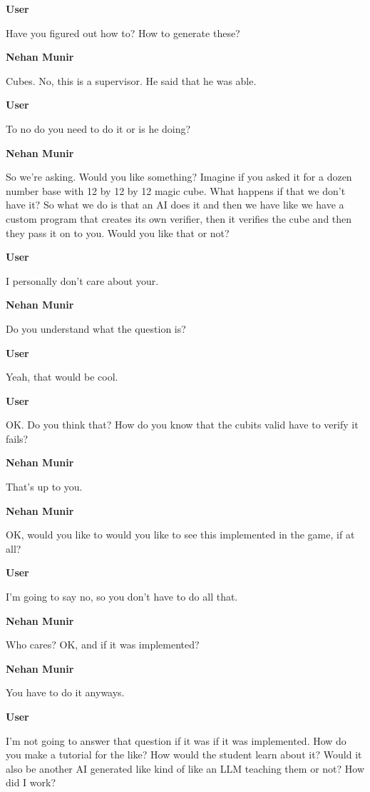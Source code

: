 \documentclass{article}
\begin{document}
\noindent \textbf{User}

Have you figured out how to? How to generate these?

\noindent \textbf{Nehan Munir}

Cubes. No, this is a supervisor. He said that he was able.

\noindent \textbf{User}

To no do you need to do it or is he doing?

\noindent \textbf{Nehan Munir}

So we're asking. Would you like something? Imagine if you asked it for a dozen number base with 12 by 12 by 12 magic cube. What happens if that we don't have it? So what we do is that an AI does it and then we have like we have a custom program that creates its own verifier, then it verifies the cube and then they pass it on to you. Would you like that or not?

\noindent \textbf{User}

I personally don't care about your.

\noindent \textbf{Nehan Munir}

Do you understand what the question is?

\noindent \textbf{User}

Yeah, that would be cool.

\noindent \textbf{User}

OK. Do you think that? How do you know that the cubits valid have to verify it fails?

\noindent \textbf{Nehan Munir}

That's up to you.

\noindent \textbf{Nehan Munir}

OK, would you like to would you like to see this implemented in the game, if at all?

\noindent \textbf{User}

I'm going to say no, so you don't have to do all that.

\noindent \textbf{Nehan Munir}

Who cares? OK, and if it was implemented?

\noindent \textbf{Nehan Munir}

You have to do it anyways.

\noindent \textbf{User}

I'm not going to answer that question if it was if it was implemented. How do you make a tutorial for the like? How would the student learn about it? Would it also be another AI generated like kind of like an LLM teaching them or not? How did I work?
\end{document}
